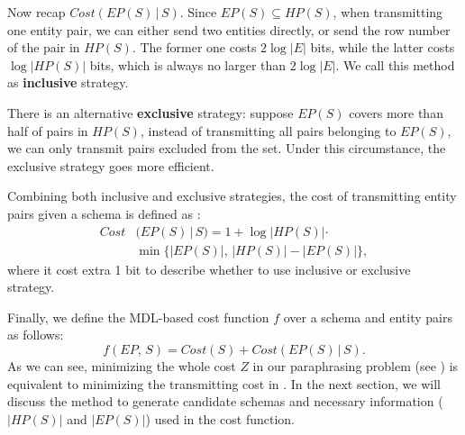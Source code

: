Now recap $Cost(EP(S)\, |\, S)$.
Since $EP(S) \subseteq HP(S)$, when transmitting one entity pair,
we can either send two entities directly, or send the row number of the pair in $HP(S)$.
The former one costs $2\log|E|$ bits, while the latter costs $\log{|HP(S)|}$ bits,
which is always no larger than $2\log|E|$.
We call this method as \textbf{inclusive} strategy.

There is an alternative \textbf{exclusive} strategy: suppose $EP(S)$ covers more than
half of pairs in $HP(S)$, instead of transmitting all pairs belonging to $EP(S)$,
we can only transmit pairs excluded from the set. Under this circumstance, the exclusive
strategy goes more efficient.

Combining both inclusive and exclusive strategies, the cost of transmitting entity pairs
given a schema is defined as :
\begin{equation}
\label{eqn:costd}
\begin{aligned}
Cost&(EP(S)\, |\, S) = 1 + \log|HP(S)| \cdot   \\
    &\min\{|EP(S)|,\, |HP(S)| - |EP(S)|\},
\end{aligned}
\end{equation}
\noindent
where it cost extra 1 bit to describe whether to use inclusive or exclusive strategy.

Finally, we define the MDL-based cost function $f$
over a schema and entity pairs as follows:
\begin{equation}
\label{eqn:f}
f(EP,\, S) = Cost(S) + Cost(EP(S)\, |\, S).
\end{equation}
As we can see, minimizing the whole cost $Z$ in our paraphrasing problem (see )
is equivalent to minimizing the transmitting cost in .
In the next section, we will discuss the method to generate candidate schemas
and necessary information ($|HP(S)|$ and $|EP(S)|$) used in the cost function.

